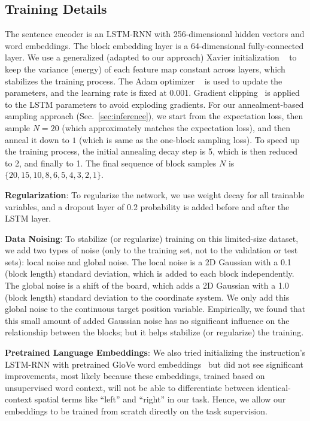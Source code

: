 \documentclass[letterpaper]{article} %
\begin{document}
\subsection{Training Details}
\label{sec:trainingdetails}
The sentence encoder is an LSTM-RNN with 256-dimensional hidden vectors and word embeddings. The block embedding layer is a 64-dimensional fully-connected layer. We use a generalized (adapted to our approach) Xavier initialization ~\cite{glorot2010understanding} to keep the variance (energy) of each feature map constant across layers, which stabilizes the training process. The Adam optimizer ~\cite{kingma2014adam} is used to update the parameters, and the learning rate is fixed at 0.001. Gradient clipping~\cite{pascanu2013difficulty} is applied to the LSTM parameters to avoid exploding gradients. 
For our annealment-based sampling approach (Sec.~\ref{sec:inference}), we start from the expectation loss, then sample $N=20$ (which approximately matches the expectation loss), and then anneal it down to $1$ (which is same as the one-block sampling loss). To speed up the training process, the initial annealing decay step is 5, which is then reduced to 2, and finally to 1. The final sequence of block samples $N$ is $\{20, 15, 10, 8, 6, 5, 4, 3, 2, 1\}$.


\textbf{Regularization}: To regularize the network, we use weight decay for all trainable variables, and a dropout layer of 0.2 probability is added before and after the LSTM layer. 

\textbf{Data Noising}: To stabilize (or regularize) training on this limited-size dataset, we add two types of noise (only to the training set, not to the validation or test sets): local noise and global noise. The local noise is a 2D Gaussian with a 0.1 (block length) standard deviation, which is added to each block independently. The global noise is a shift of the board, which adds a 2D Gaussian with a 1.0 (block length) standard deviation to the coordinate system. We only add this global noise to the continuous target position variable. Empirically, we found that this small amount of added Gaussian noise has no significant influence on the relationship between the blocks;
but it helps stabilize (or regularize) the training.

\textbf{Pretrained Language Embeddings}: We also tried initializing the instruction's LSTM-RNN with pretrained GloVe word embeddings~\cite{pennington2014glove} but did not see significant improvements, most likely because these embeddings, trained based on unsupervised word context, will not be able to differentiate between identical-context spatial terms like ``left'' and ``right'' in our task. Hence, we allow our embeddings to be trained from scratch directly on the task supervision.
\end{document}
